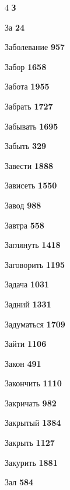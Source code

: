 \begin{multicols}{4}
\vspace{0.6em}\noindent\textbf{\normalsize\sffamily\color{primary} З}\par\vspace{0.2em}
\noindent За \dotfill \textbf{\color{secondary} 24}\par
\noindent Заболевание \dotfill \textbf{\color{secondary} 957}\par
\noindent Забор \dotfill \textbf{\color{secondary} 1658}\par
\noindent Забота \dotfill \textbf{\color{secondary} 1955}\par
\noindent Забрать \dotfill \textbf{\color{secondary} 1727}\par
\noindent Забывать \dotfill \textbf{\color{secondary} 1695}\par
\noindent Забыть \dotfill \textbf{\color{secondary} 329}\par
\noindent Завести \dotfill \textbf{\color{secondary} 1888}\par
\noindent Зависеть \dotfill \textbf{\color{secondary} 1550}\par
\noindent Завод \dotfill \textbf{\color{secondary} 988}\par
\noindent Завтра \dotfill \textbf{\color{secondary} 558}\par
\noindent Заглянуть \dotfill \textbf{\color{secondary} 1418}\par
\noindent Заговорить \dotfill \textbf{\color{secondary} 1195}\par
\noindent Задача \dotfill \textbf{\color{secondary} 1031}\par
\noindent Задний \dotfill \textbf{\color{secondary} 1331}\par
\noindent Задуматься \dotfill \textbf{\color{secondary} 1709}\par
\noindent Зайти \dotfill \textbf{\color{secondary} 1106}\par
\noindent Закон \dotfill \textbf{\color{secondary} 491}\par
\noindent Закончить \dotfill \textbf{\color{secondary} 1110}\par
\noindent Закричать \dotfill \textbf{\color{secondary} 982}\par
\noindent Закрытый \dotfill \textbf{\color{secondary} 1384}\par
\noindent Закрыть \dotfill \textbf{\color{secondary} 1127}\par
\noindent Закурить \dotfill \textbf{\color{secondary} 1881}\par
\noindent Зал \dotfill \textbf{\color{secondary} 584}\par

\end{multicols}

